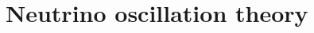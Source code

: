 \section{Neutrino oscillation theory}
\label{sec:theory_theory}

\begin{comment}
- B. Pontecorvo first described neutrino oscillation, by nautrino and anti nuetrinos in 1957, later Maki, Nakagawa and Sakata in 1962 included electon and muon neutrino mixing
- The original standard model had the neutrinos as massless. But given that neutrinos oscillations have been observed this is now not valid.
- It is possible to modify the standard model to allow for this fact without new physics, but it is generally considered to be a significant break in the SM.
- Can be explained by the quantum pheneomentum of interferance.
- With the flavour and mass eigenstates not being evuivalent, this mixing is described by the rotation PMNS matrix, analogous to the CKM mixing describing mixing in the quark sector.
- The energy state propogation is well defined, causing the neutrino flavour to change with time in an oscillatory fashion. Such that a muon neutrino after travelling a distance can be detected as
a electon of tau neutrino but after another distance be detector as a muon neutrino again.

- The neutrino has no electric charge, virtually no mass, and can travel undetectably for vast distances.
- How does the standard model allow for neutrino masses?
- Fermi vs majorana mass terms, which one is more likely etc
DIAGRAM: For a given fixed baseline, show the oscillation probability as a function of energy, do this for the chips location.
- Talk about the full neutrino oscillation equations, but also the simplified ones and then how they affect the shape of the probability curves.
EQUATION: Basic neutrino oscillation equations
EQUATION: Neutrino oscillations in matter equations
EQUATION: Matter effect equations
- We look at the oscillation structure across a range of energies in our detectors to measure the oscilaltion parameters.
INFO: How the shape of the neutrino flux at the far detector affects the parameters, reduction fraction, position of the dip etc... maybe a little diagram


\end{comment}
